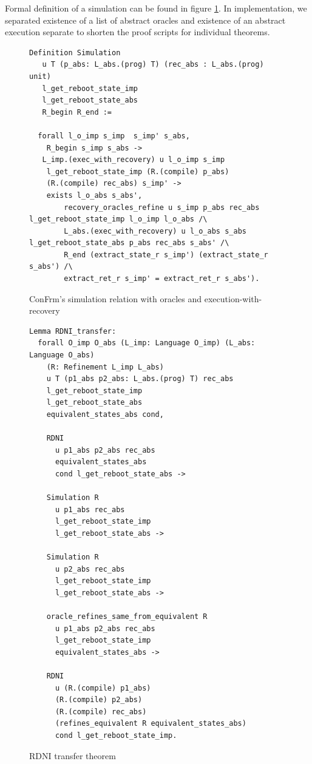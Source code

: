 Formal definition of a simulation can be found in figure \ref{fig:Simulation_Definition}. In implementation, we separated existence of a list of abstract oracles and existence of an abstract execution separate to shorten the proof scripts for individual theorems.   

\begin{figure}[ht]
\centering
\begin{verbatim}
Definition Simulation
   u T (p_abs: L_abs.(prog) T) (rec_abs : L_abs.(prog) unit)
   l_get_reboot_state_imp
   l_get_reboot_state_abs
   R_begin R_end :=
   
  forall l_o_imp s_imp  s_imp' s_abs,
    R_begin s_imp s_abs ->
   L_imp.(exec_with_recovery) u l_o_imp s_imp
    l_get_reboot_state_imp (R.(compile) p_abs)
    (R.(compile) rec_abs) s_imp' ->
    exists l_o_abs s_abs',
        recovery_oracles_refine u s_imp p_abs rec_abs l_get_reboot_state_imp l_o_imp l_o_abs /\
        L_abs.(exec_with_recovery) u l_o_abs s_abs l_get_reboot_state_abs p_abs rec_abs s_abs' /\
        R_end (extract_state_r s_imp') (extract_state_r s_abs') /\
        extract_ret_r s_imp' = extract_ret_r s_abs').
\end{verbatim}
\caption{ConFrm's simulation relation with oracles and execution-with-recovery}
\label{fig:Simulation_Definition}
\end{figure}


\begin{figure}[ht]
\centering
\begin{verbatim}
Lemma RDNI_transfer:
  forall O_imp O_abs (L_imp: Language O_imp) (L_abs: Language O_abs) 
    (R: Refinement L_imp L_abs)
    u T (p1_abs p2_abs: L_abs.(prog) T) rec_abs
    l_get_reboot_state_imp
    l_get_reboot_state_abs
    equivalent_states_abs cond,

    RDNI
      u p1_abs p2_abs rec_abs
      equivalent_states_abs
      cond l_get_reboot_state_abs ->
    
    Simulation R 
      u p1_abs rec_abs 
      l_get_reboot_state_imp
      l_get_reboot_state_abs ->

    Simulation R 
      u p2_abs rec_abs 
      l_get_reboot_state_imp
      l_get_reboot_state_abs ->
    
    oracle_refines_same_from_equivalent R 
      u p1_abs p2_abs rec_abs 
      l_get_reboot_state_imp 
      equivalent_states_abs ->
    
    RDNI
      u (R.(compile) p1_abs)
      (R.(compile) p2_abs)
      (R.(compile) rec_abs)
      (refines_equivalent R equivalent_states_abs)
      cond l_get_reboot_state_imp.
\end{verbatim}
\caption{RDNI transfer theorem}
\label{fig:RDNI_Transfer_Definition}
\end{figure}


